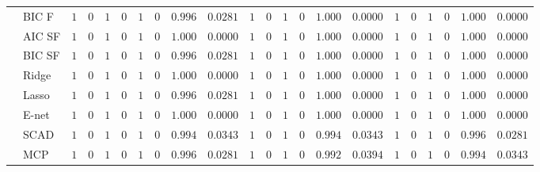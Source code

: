 \begin{tabular}{ll|ll|llllll|llllll|llllll}
 & BIC F  & $1$ & $0$ & $1$ & $0$ & $1$ & $0$ & $0.996$ & $0.0281$ & $1$ & $0$ & $1$ & $0$ & $1.000$ & $0.0000$ & $1$ & $0$ & $1$ & $0$ & $1.000$ & $0.0000$ \\
 & AIC SF  & $1$ & $0$ & $1$ & $0$ & $1$ & $0$ & $1.000$ & $0.0000$ & $1$ & $0$ & $1$ & $0$ & $1.000$ & $0.0000$ & $1$ & $0$ & $1$ & $0$ & $1.000$ & $0.0000$ \\
 & BIC SF  & $1$ & $0$ & $1$ & $0$ & $1$ & $0$ & $0.996$ & $0.0281$ & $1$ & $0$ & $1$ & $0$ & $1.000$ & $0.0000$ & $1$ & $0$ & $1$ & $0$ & $1.000$ & $0.0000$ \\
 & Ridge  & $1$ & $0$ & $1$ & $0$ & $1$ & $0$ & $1.000$ & $0.0000$ & $1$ & $0$ & $1$ & $0$ & $1.000$ & $0.0000$ & $1$ & $0$ & $1$ & $0$ & $1.000$ & $0.0000$ \\
 & Lasso  & $1$ & $0$ & $1$ & $0$ & $1$ & $0$ & $0.996$ & $0.0281$ & $1$ & $0$ & $1$ & $0$ & $1.000$ & $0.0000$ & $1$ & $0$ & $1$ & $0$ & $1.000$ & $0.0000$ \\
 & E-net  & $1$ & $0$ & $1$ & $0$ & $1$ & $0$ & $1.000$ & $0.0000$ & $1$ & $0$ & $1$ & $0$ & $1.000$ & $0.0000$ & $1$ & $0$ & $1$ & $0$ & $1.000$ & $0.0000$ \\
 & SCAD  & $1$ & $0$ & $1$ & $0$ & $1$ & $0$ & $0.994$ & $0.0343$ & $1$ & $0$ & $1$ & $0$ & $0.994$ & $0.0343$ & $1$ & $0$ & $1$ & $0$ & $0.996$ & $0.0281$ \\
 & MCP  & $1$ & $0$ & $1$ & $0$ & $1$ & $0$ & $0.996$ & $0.0281$ & $1$ & $0$ & $1$ & $0$ & $0.992$ & $0.0394$ & $1$ & $0$ & $1$ & $0$ & $0.994$ & $0.0343$ \\
\hline 
\end{tabular}

